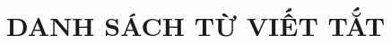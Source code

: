 \documentclass[a4paper,11pt,oneside]{book}
\begin{document}
	\clearpage
	
	
	\tableofcontents
	
	\clearpage
	\pagestyle{plain}
	
	
	\chapter*{DANH SÁCH TỪ VIẾT TẮT}
	
	\vspace{-0.7cm}
	
\end{document}
